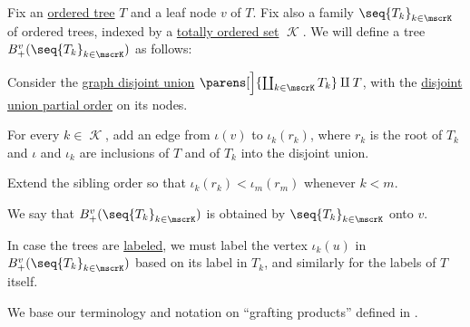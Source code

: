 \begin{definition}\label{def:ordered_tree_grafting}\mimprovised
  Fix an \hyperref[def:ordered_tree]{ordered tree} \( T \) and a leaf node \( v \) of \( T \). Fix also a family \( \seq{ T_k }_{k \in \mscrK} \) of ordered trees, indexed by a \hyperref[def:totally_ordered_set]{totally ordered set} \( \mscrK \). We will define a tree \( B_+^v(\seq{ T_k }_{k \in \mscrK}) \) as follows:
  \begin{thmenum}
     Consider the \hyperref[def:graph_disjoint_union]{graph disjoint union} \( \parens[\Big]{ \coprod_{k \in \mscrK} T_k } \amalg T \), with the \hyperref[thm:order_category_isomorphism_properties/coproduct]{disjoint union partial order} on its nodes.

     For every \( k \in \mscrK \), add an edge from \( \iota(v) \) to \( \iota_k(r_k) \), where \( r_k \) is the root of \( T_k \) and \( \iota \) and \( \iota_k \) are inclusions of \( T \) and of \( T_k \) into the disjoint union.

     Extend the sibling order so that \( \iota_k(r_k) < \iota_m(r_m) \) whenever \( k < m \).
  \end{thmenum}

  We say that \( B_+^v(\seq{ T_k }_{k \in \mscrK}) \) is obtained by  \( \seq{ T_k }_{k \in \mscrK} \) onto \( v \).
\end{definition}
\begin{comments}
  \item In case the trees are \hyperref[def:labeled_tree]{labeled}, we must label the vertex \( \iota_k(u) \) in \( B_+^v(\seq{ T_k }_{k \in \mscrK}) \) based on its label in \( T_k \), and similarly for the labels of \( T \) itself.

  \item We base our terminology and notation on \enquote{grafting products} defined in .
\end{comments}

